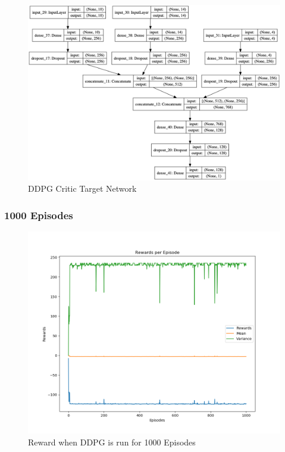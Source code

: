 \documentclass[doc, onecolumn, 12pt]{apa6}
\begin{document}
\begin{figure}
\label{DDPG_CriticTarget}
\includegraphics[width=\textwidth]{results/ddpg/DDPG_critictg.png}
\caption{DDPG Critic Target Network}
\end{figure}



\FloatBarrier
\subsubsection{1000 Episodes}

\begin{figure}
\includegraphics[width =\textwidth, height=0.4 \textheight]{results/ddpg/1000_ep/Rewards.png}
\caption{Reward when DDPG is run for 1000 Episodes}
\label{DDPG_1000Ep_Rewards}
\end{figure}
\end{document}
